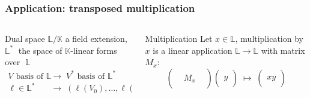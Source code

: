 \documentclass[10pt]{beamer}
\newcommand{\K}{\mathbb{K}}
\newcommand{\LK}{\mathbb{L}}
\begin{document}
\begin{frame}
  \frametitle{Application: transposed multiplication}

  \vspace{-3mm}

  \begin{columns}
    \begin{column}{0.45\textwidth}
      \begin{block}{Dual space}
        $\LK/\K$ a field extension, $\LK^\ast\;$ the space of $\K$-linear forms over
        $\;\LK$
        \begin{align*}
          V \text{ basis of } \LK &\;\rightarrow\; V^\ast
          \text{ basis of } \LK^\ast\\
          \ell\in\LK^\ast &\;\rightarrow\;
          \left(\ell(V_0),\ldots,\ell(V_n)\right)
        \end{align*}
      \end{block}
    \end{column}
    \begin{column}{0.5\textwidth}
      \begin{block}{Multiplication}
        Let $x\in\LK$, multiplication by $x$ is a linear application
        $\LK\rightarrow\LK$ with matrix $M_x$:
        \begin{equation*}
          \begin{pmatrix}\\&M_x&\\&\end{pmatrix} 
          \begin{pmatrix}\\y\\{}\end{pmatrix} \;\mapsto\;
          \begin{pmatrix}\\xy\\{}\end{pmatrix}
        \end{equation*}
      \end{block}
    \end{column}
  \end{columns}


\end{frame}
\end{document}
